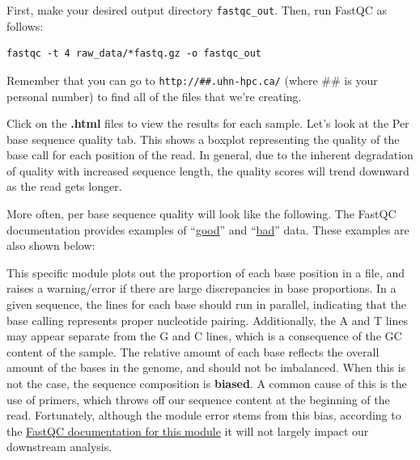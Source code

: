\documentclass[
]{book}
\begin{document}
First, make your desired output directory \texttt{fastqc\_out}. Then, run FastQC as follows:

\begin{verbatim}
fastqc -t 4 raw_data/*fastq.gz -o fastqc_out
\end{verbatim}

Remember that you can go to \texttt{http://\#\#.uhn-hpc.ca/} (where \#\# is your personal number) to find all of the files that we're creating.

Click on the \textbf{.html} files to view the results for each sample. Let's look at the Per base sequence quality tab. This shows a boxplot representing the quality of the base call for each position of the read. In general, due to the inherent degradation of quality with increased sequence length, the quality scores will trend downward as the read gets longer.

More often, per base sequence quality will look like the following. The FastQC documentation provides examples of ``\href{https://www.bioinformatics.babraham.ac.uk/projects/fastqc/good_sequence_short_fastqc.html\#M1}{good}'' and ``\href{https://www.bioinformatics.babraham.ac.uk/projects/fastqc/bad_sequence_fastqc.html}{bad}'' data. These examples are also shown below:

This specific module plots out the proportion of each base position in a file, and raises a warning/error if there are large discrepancies in base proportions. In a given sequence, the lines for each base should run in parallel, indicating that the base calling represents proper nucleotide pairing. Additionally, the A and T lines may appear separate from the G and C lines, which is a consequence of the GC content of the sample. The relative amount of each base reflects the overall amount of the bases in the genome, and should not be imbalanced. When this is not the case, the sequence composition is \textbf{biased}. A common cause of this is the use of primers, which throws off our sequence content at the beginning of the read. Fortunately, although the module error stems from this bias, according to the \href{https://www.bioinformatics.babraham.ac.uk/projects/fastqc/Help/3\%20Analysis\%20Modules/4\%20Per\%20Base\%20Sequence\%20Content.html\#:~:text=Whilst\%20this\%20is\%20a\%20true\%20technical\%20bias\%2C\%20it\%20isn\%27t\%20something\%20which\%20can\%20be\%20corrected\%20by\%20trimming\%20and\%20in\%20most\%20cases\%20doesn\%27t\%20seem\%20to\%20adversely\%20affect\%20the\%20downstream\%20analysis.}{FastQC documentation for this module} it will not largely impact our downstream analysis.
\end{document}
